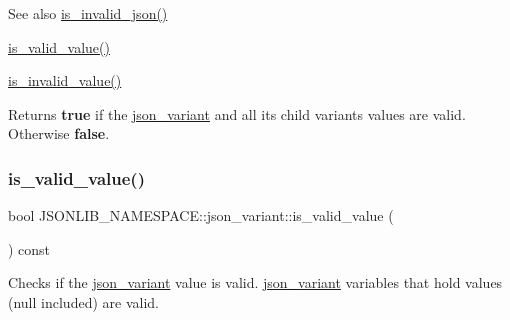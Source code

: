 \begin{DoxySeeAlso}{See also}
\hyperlink{classJSONLIB__NAMESPACE_1_1json__variant_a1a08b35da4cf3a334d32ebb81b20c08a}{is\+\_\+invalid\+\_\+json()} 

\hyperlink{classJSONLIB__NAMESPACE_1_1json__variant_a224aab2dd56e3928dd893be8b7f3367a}{is\+\_\+valid\+\_\+value()} 

\hyperlink{classJSONLIB__NAMESPACE_1_1json__variant_ab6552a5e3de90ab1fbca078e5c245bfb}{is\+\_\+invalid\+\_\+value()} 
\end{DoxySeeAlso}
\begin{DoxyReturn}{Returns}
{\bfseries true} if the \hyperlink{classJSONLIB__NAMESPACE_1_1json__variant}{json\+\_\+variant} and all its child variants values are valid. Otherwise {\bfseries false}. 
\end{DoxyReturn}
\mbox{\label{classJSONLIB__NAMESPACE_1_1json__variant_a224aab2dd56e3928dd893be8b7f3367a}} 
\subsubsection{\texorpdfstring{is\+\_\+valid\+\_\+value()}{is\_valid\_value()}}
{\footnotesize\ttfamily bool J\+S\+O\+N\+L\+I\+B\+\_\+\+N\+A\+M\+E\+S\+P\+A\+C\+E\+::json\+\_\+variant\+::is\+\_\+valid\+\_\+value (\begin{DoxyParamCaption}{ }\end{DoxyParamCaption}) const}



Checks if the \hyperlink{classJSONLIB__NAMESPACE_1_1json__variant}{json\+\_\+variant} value is valid. \hyperlink{classJSONLIB__NAMESPACE_1_1json__variant}{json\+\_\+variant} variables that hold values (null included) are valid. 

